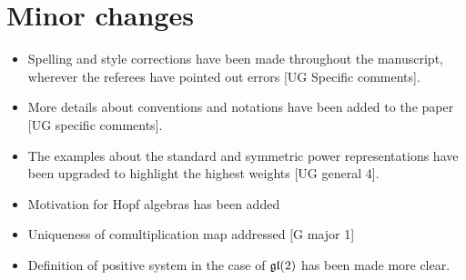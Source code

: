 \documentclass[12pt]{article}
\begin{document}
\section{Minor changes}
\begin{itemize}
    \item Spelling and style corrections have been made throughout the manuscript,
    wherever the referees have pointed out errors [UG Specific comments].
    \item More details about conventions and notations have been added to the paper [UG specific comments].
    \item The examples about the standard and symmetric power representations have
    been upgraded to highlight the highest weights [UG general 4].
    \item Motivation for Hopf algebras has been added 
    \item Uniqueness of comultiplication map addressed [G major 1]
    \item Definition of positive system in the case of $\operatorname{\mathfrak{gl}}(2)$ has been made more clear.

\end{itemize}
\end{document}
